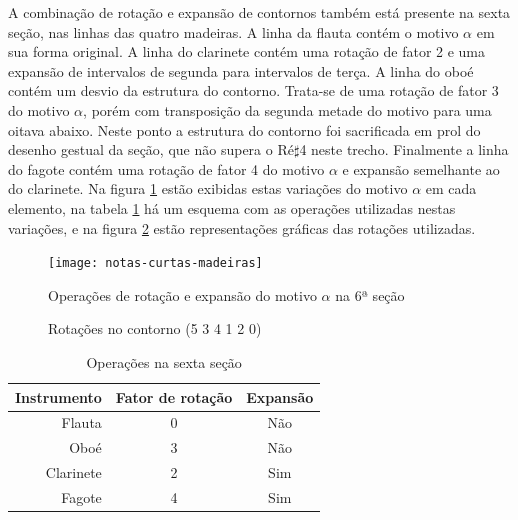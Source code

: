 A combinação de rotação e expansão de contornos também está presente
na sexta seção, nas linhas das quatro madeiras. A linha da flauta
contém o motivo $\alpha$ em sua forma original. A linha do clarinete
contém uma rotação de fator 2 e uma expansão de intervalos de segunda
para intervalos de terça. A linha do oboé contém um desvio da
estrutura do contorno. Trata-se de uma rotação de fator 3 do motivo
$\alpha$, porém com transposição da segunda metade do motivo para uma
oitava abaixo. Neste ponto a estrutura do contorno foi sacrificada em
prol do desenho gestual da seção, que não supera o Ré$\sharp$4 neste
trecho. Finalmente a linha do fagote contém uma rotação de fator 4 do
motivo $\alpha$ e expansão semelhante ao do clarinete. Na figura
\ref{fig:notas-curtas-madeiras} estão exibidas estas variações do
motivo $\alpha$ em cada elemento, na tabela
\ref{tab:operacoes-secao-6} há um esquema com as operações utilizadas
nestas variações, e na figura \ref{fig:rotacoes-534120} estão
representações gráficas das rotações utilizadas.

\begin{figure}
  \centering
    \texttt{[image: notas-curtas-madeiras]}
    \caption{Operações de rotação e expansão do motivo $\alpha$ na 6ª
    seção}
  \label{fig:notas-curtas-madeiras}
\end{figure}

\begin{figure}
  \centering
  \subfloat[Rotação 2: (4 1 2 0 5 3)]{
    \texttt{[image: c-412053]}
    \label{fig:412053}  
  }
  \subfloat[Rotação 3: (1 2 0 5 3 4)]{
    \texttt{[image: c-120534]}
    \label{fig:120534}  
  }
  \subfloat[Rotação 4: (2 0 5 3 4 1)]{
    \texttt{[image: c-205341]}
    \label{fig:205341}  
  }
  \caption{Rotações no contorno (5 3 4 1 2 0)}
  \label{fig:rotacoes-534120}
\end{figure}

\begin{table}
  \centering
  \begin{tabular}{r|cc}
    Instrumento & Fator de rotação & Expansão \\
    \hline
    Flauta & 0 & Não \\
    Oboé & 3 & Não \\
    Clarinete & 2 & Sim \\
    Fagote & 4 & Sim \\
  \end{tabular}
  \caption{Operações na sexta seção}
  \label{tab:operacoes-secao-6}
\end{table}

